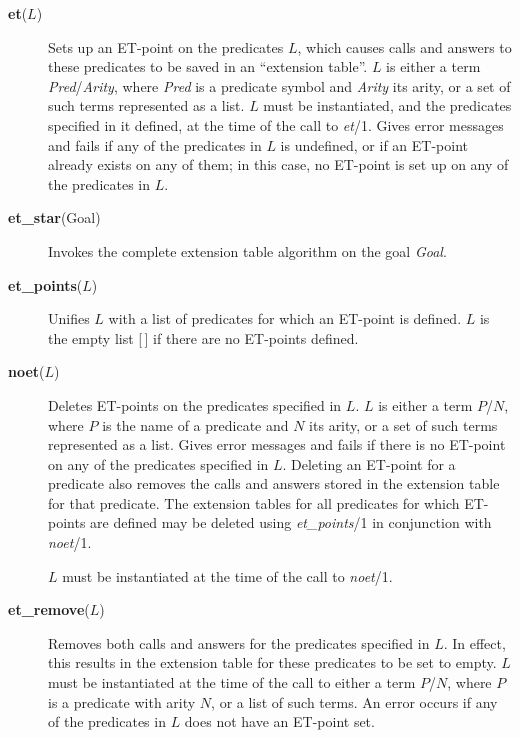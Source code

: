 \begin{description}
\item[{\bf et}($L$)] 
    Sets up an ET-point on the predicates $L$, which causes calls and
    answers to these predicates to be saved in an ``extension table''.
    $L$ is either a term {\em Pred}/{\em Arity}, where {\em Pred} is a predicate
    symbol and {\em Arity} its arity,
    or a set of such terms represented as a list.
    $L$ must be instantiated, and the predicates specified in it defined,
    at the time of the call to {\em et}/1.
    Gives error messages and fails if any of the predicates in $L$ is undefined,
    or if an ET-point already exists on any of them; in this case, no ET-point
    is set up on any of the predicates in $L$.

\item[{\bf et\_star}(Goal)] 
    Invokes the complete extension table algorithm on the goal {\em Goal}.

\item[{\bf et\_points}($L$)]
    Unifies $L$ with a list of predicates for which an ET-point is defined.
    $L$ is the empty list [\,] if there are no ET-points defined.

\item[{\bf noet}($L$)] 
    Deletes ET-points on the predicates specified in $L$.
    $L$ is either a term $P$/$N$, where $P$ is the name of a predicate and
    $N$ its arity, or a set of such terms represented as a list.
    Gives error messages and fails if there is no ET-point on any
    of the predicates specified in $L$.
    Deleting an ET-point for a predicate also removes the calls and
    answers stored in the extension table for that predicate.
    The extension tables for all predicates for which ET-points are defined
    may be deleted using {\em et\_\/points}/1 in conjunction with {\em noet}/1.

    $L$ must be instantiated at the time of the call to {\em noet}/1.

\item[{\bf et\_remove}($L$)]
    Removes both calls and answers for the predicates specified in $L$.
    In effect, this results in the extension table for these predicates
    to be set to empty.
    $L$ must be instantiated at the time of the call to either a term $P$/$N$,
    where $P$ is a predicate with arity $N$, or a list of such terms.
    An error occurs if any of the predicates in $L$
    does not have an ET-point set.


\end{description}
